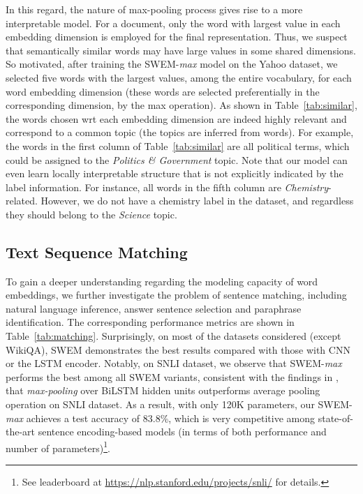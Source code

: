 \documentclass[11pt,a4paper]{article}
\begin{document}
In this regard, the nature of max-pooling process gives rise to a more interpretable model.
For a document, only the word with largest value in each embedding dimension is employed for the final representation.
Thus, we suspect that semantically similar words may have large values in some shared dimensions.
So motivated, after training the SWEM-\emph{max} model on the Yahoo dataset, we selected five words with the largest values, among the entire vocabulary, for each word embedding dimension (these words are selected preferentially in the corresponding dimension, by the max operation).
As shown in Table~\ref{tab:similar}, the words chosen wrt each embedding dimension are indeed highly relevant and correspond to a common topic (the topics are inferred from words).
For example, the words in the first column of Table~\ref{tab:similar} are all political terms, which could be assigned to the \emph{Politics \& Government} topic.
Note that our model can even learn locally interpretable structure that is not explicitly indicated by the label information.
For instance, all words in the fifth column are \emph{Chemistry}-related.
However, we do not have a chemistry label in the dataset, and regardless they should belong to the \emph{Science} topic.



\subsection{Text Sequence Matching}
To gain a deeper understanding regarding the modeling capacity of word embeddings, we further investigate the problem of sentence matching, including natural language inference, answer sentence selection and paraphrase identification.
The corresponding performance metrics are shown in Table~\ref{tab:matching}.
Surprisingly, on most of the datasets considered (except WikiQA), SWEM demonstrates the best results compared with those with CNN or the LSTM encoder.
Notably, on SNLI dataset, we observe that SWEM-\emph{max} performs the best among all SWEM variants, consistent with the findings in \citet{nie2017shortcut, conneau2017supervised}, that \emph{max-pooling} over BiLSTM hidden units outperforms average pooling operation on SNLI dataset.
As a result, with only 120K parameters, our SWEM-\emph{max} achieves a test accuracy of 83.8\%, which is very competitive among state-of-the-art sentence encoding-based models (in terms of both performance and number of parameters)\footnote{See leaderboard at \url{https://nlp.stanford.edu/projects/snli/} for details.}.
\end{document}
